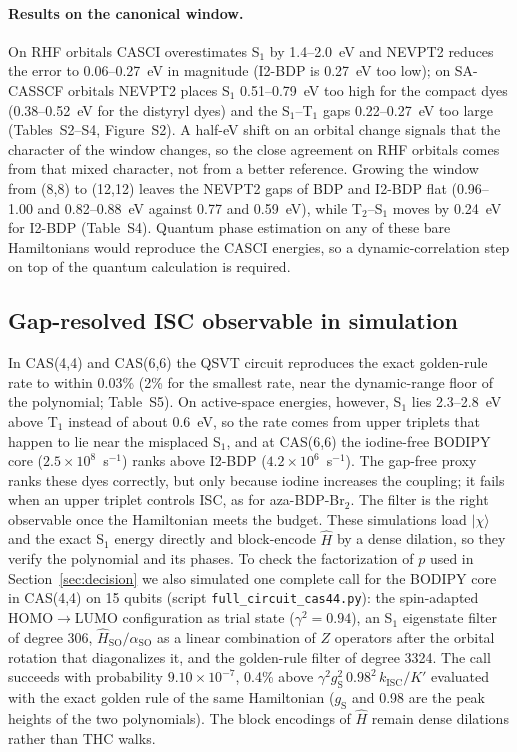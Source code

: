 \documentclass[journal=jctcce,manuscript=article]{achemso}
\newcommand{\kisc}{k_\mathrm{ISC}}
\newcommand{\Hso}{\hat H_\mathrm{SO}}
\newcommand{\aso}{\alpha_\mathrm{SO}}
\begin{document}
\paragraph{Results on the canonical window.} On RHF orbitals CASCI overestimates S$_1$ by 1.4--2.0~eV and
NEVPT2 reduces the error to 0.06--0.27~eV in magnitude (I2-BDP is 0.27~eV too low); on SA-CASSCF orbitals NEVPT2
places S$_1$ 0.51--0.79~eV too high for the compact dyes (0.38--0.52~eV for the distyryl dyes) and
the S$_1$--T$_1$ gaps 0.22--0.27~eV too large (Tables~S2--S4, Figure~S2). A half-eV shift on an orbital change
signals that the character of the window changes, so the close agreement on RHF orbitals comes from that mixed
character, not from a better reference. Growing the window from (8,8) to (12,12) leaves the NEVPT2 gaps of BDP
and I2-BDP flat (0.96--1.00 and 0.82--0.88~eV against 0.77 and 0.59~eV), while T$_2$--S$_1$ moves by 0.24~eV
for I2-BDP (Table~S4). Quantum phase estimation on any of these bare
Hamiltonians would reproduce the CASCI energies, so a dynamic-correlation step on top of the quantum calculation
is required.

\subsection{Gap-resolved ISC observable in simulation}
\label{sec:filter}

In CAS(4,4) and CAS(6,6) the QSVT circuit reproduces the exact golden-rule rate to within 0.03\%
(2\% for the smallest rate, near the dynamic-range floor of the polynomial; Table~S5). On active-space
energies, however, S$_1$ lies 2.3--2.8~eV above T$_1$ instead of about 0.6~eV, so the rate comes from upper
triplets that happen to lie near the misplaced S$_1$, and at CAS(6,6) the iodine-free BODIPY core
($2.5\times10^{8}$~s$^{-1}$) ranks above I2-BDP ($4.2\times10^{6}$~s$^{-1}$). The gap-free proxy ranks these
dyes correctly, but only because iodine increases the coupling; it fails when an upper triplet controls ISC,
as for aza-BDP-Br$_2$. The filter is the right observable once the Hamiltonian meets the budget. These simulations load
$\lvert\chi\rangle$ and the exact S$_1$ energy directly and block-encode $\hat H$ by a dense dilation, so they verify
the polynomial and its phases. To check the factorization of $p$ used in Section~\ref{sec:decision} we also
simulated one complete call for the BODIPY core in CAS(4,4) on 15 qubits (script \texttt{full\_circuit\_cas44.py}):
the spin-adapted HOMO$\to$LUMO configuration as trial state ($\gamma^2=0.94$), an S$_1$ eigenstate filter of degree
306, $\Hso/\aso$ as a linear combination of $Z$ operators after the orbital rotation that diagonalizes it, and the
golden-rule filter of degree 3324. The call succeeds with probability $9.10\times10^{-7}$, 0.4\% above
$\gamma^2g_\mathrm{S}^2\,0.98^2\,\kisc/K'$ evaluated with the exact golden rule of the same Hamiltonian
($g_\mathrm{S}$ and 0.98 are the peak heights of the two polynomials). The block encodings of $\hat H$ remain dense
dilations rather than THC walks.
\end{document}
